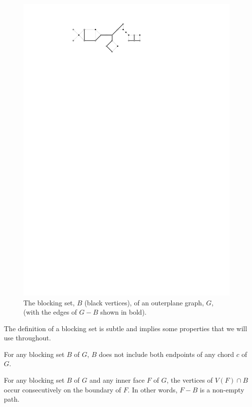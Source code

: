 \documentclass{cccg16}
\begin{document}
\begin{figure}
  \begin{center}
     \includegraphics{figs/blocking-set-1}
  \end{center}
  \caption{The blocking set, $B$ (black vertices), of an outerplane graph,
     $G$,  (with the edges of $G-B$ shown in bold).}
\end{figure}

The definition of a blocking set is subtle and implies some properties
that we will use throughout.   

\begin{obs}
   For any blocking set $B$ of $G$, $B$ does not include both endpoints
   of any chord $c$ of $G$. 
\end{obs}

\begin{obs}
   For any blocking set $B$ of $G$ and any inner face $F$ of $G$, the
   vertices of $V(F)\cap B$ occur consecutively on the boundary of $F$. 
   In other words, $F-B$ is a non-empty path.  
\end{obs}
\end{document}
